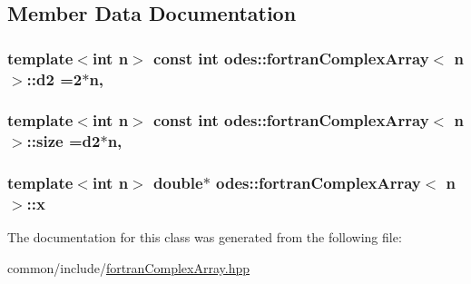 \subsection{Member Data Documentation}
\hypertarget{classodes_1_1fortranComplexArray_a4a79c76e0201e3a23c69a140d42da344}{
\subsubsection[{d2}]{\setlength{\rightskip}{0pt plus 5cm}template$<$int n$>$ const int {\bf odes\-::fortran\-Complex\-Array}$<$ n $>$\-::d2 =2$\ast$n\hspace{0.3cm}{\ttfamily [static]}, {\ttfamily [private]}}}\label{classodes_1_1fortranComplexArray_a4a79c76e0201e3a23c69a140d42da344}
\hypertarget{classodes_1_1fortranComplexArray_ac159f829fcb5c32cfbc78546d39452d0}{
\subsubsection[{size}]{\setlength{\rightskip}{0pt plus 5cm}template$<$int n$>$ const int {\bf odes\-::fortran\-Complex\-Array}$<$ n $>$\-::size ={\bf d2}$\ast$n\hspace{0.3cm}{\ttfamily [static]}, {\ttfamily [private]}}}\label{classodes_1_1fortranComplexArray_ac159f829fcb5c32cfbc78546d39452d0}
\hypertarget{classodes_1_1fortranComplexArray_a4b71df9aca87088e6481bda169307b1e}{
\subsubsection[{x}]{\setlength{\rightskip}{0pt plus 5cm}template$<$int n$>$ double$\ast$ {\bf odes\-::fortran\-Complex\-Array}$<$ n $>$\-::x\hspace{0.3cm}{\ttfamily [private]}}}\label{classodes_1_1fortranComplexArray_a4b71df9aca87088e6481bda169307b1e}


The documentation for this class was generated from the following file\-:\begin{DoxyCompactItemize}
\item 
common/include/\hyperlink{fortranComplexArray_8hpp}{fortran\-Complex\-Array.\-hpp}\end{DoxyCompactItemize}
